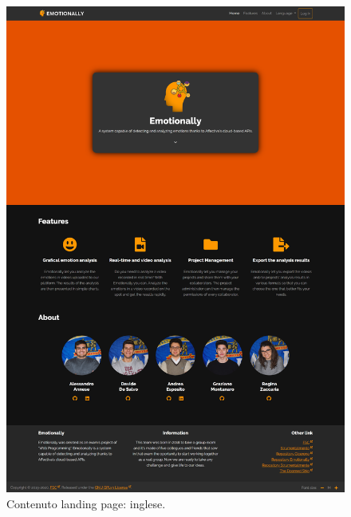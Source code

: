 \begin{figure}[H]
	\centering
	\caption{Contenuto landing page: inglese.}
	\label{fig:contenuto-landing:inglese}
	\includegraphics[width=\textwidth-20ex]{images/prototipo-editoriale/eng}
\end{figure}
